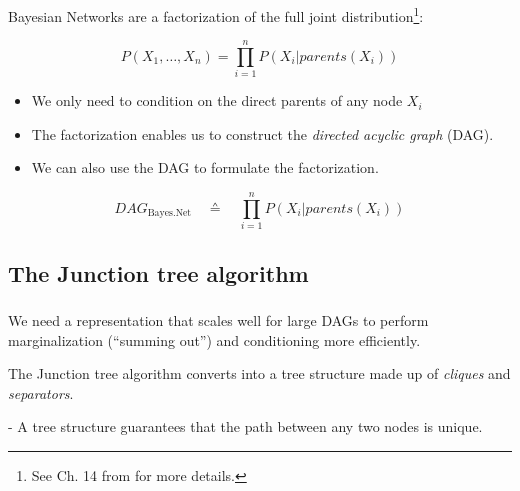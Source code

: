 \begin{frame}\frametitle{\secname}
  
Bayesian Networks are a factorization of the full joint distribution\footnote{See Ch. 14 from \citep{russell2016artificial} for more details.}:

\begin{equation}
P(X_{1},\ldots,X_{n}) = \prod_{i=1}^{n} P(X_{i} | parents(X_{i}))
\end{equation}
    
\begin{itemize}
\item We only need to condition on the direct parents of any node $X_i$

\pause 
\item The factorization enables us to construct the \emph{directed acyclic graph} (DAG).
\item We can also use the DAG to formulate the factorization.
\end{itemize}

\begin{equation}
\mathit{DAG}_{\text{Bayes.Net}} \quad \corresponds \quad \prod_{i=1}^{n} P(X_{i} | parents(X_{i}))
\end{equation}
    
\end{frame}

\subsection{The Junction tree algorithm}

\begin{frame}\frametitle{\subsecname}

We need a representation that scales well for large DAGs to perform marginalization (``summing out'') and conditioning more efficiently.

The Junction tree algorithm converts into a tree structure made up of \emph{cliques} and \emph{separators}.


\pause

- A tree structure guarantees that the path between any two nodes is unique.

\end{frame}

